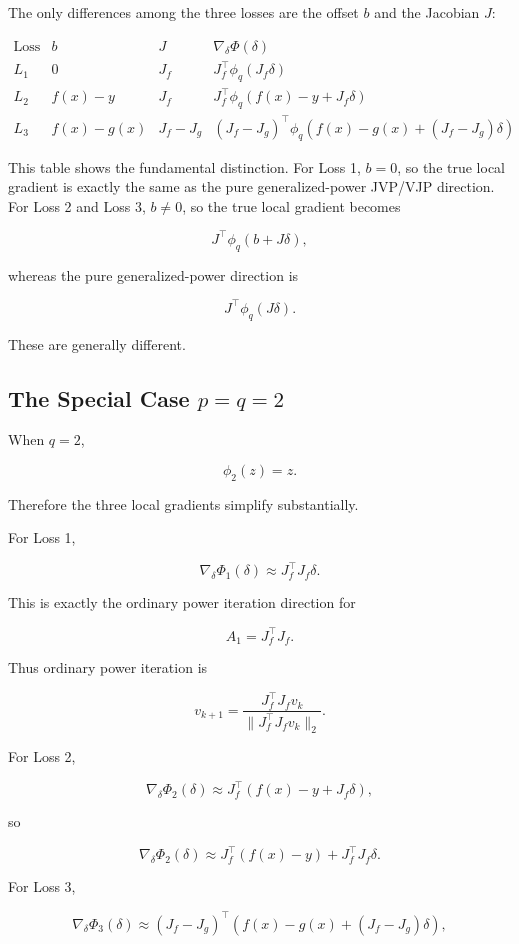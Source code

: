 \documentclass{article}
\begin{document}
The only differences among the three losses are the offset \(b\) and the Jacobian \(J\):

\[
\begin{array}{c|c|c|c}
\text{Loss} & b & J & \nabla_\delta \Phi(\delta)\\
\hline
L_1 & 0 & J_f
&
J_f^\top\phi_q(J_f\delta)
\\
L_2 & f(x)-y & J_f
&
J_f^\top\phi_q(f(x)-y+J_f\delta)
\\
L_3 & f(x)-g(x) & J_f-J_g
&
(J_f-J_g)^\top
\phi_q
\left(
f(x)-g(x)+(J_f-J_g)\delta
\right)
\end{array}
\]

This table shows the fundamental distinction. For Loss 1, \(b=0\), so the true local gradient is exactly the same as the pure generalized-power JVP/VJP direction. For Loss 2 and Loss 3, \(b\neq0\), so the true local gradient becomes

\[
J^\top\phi_q(b+J\delta),
\]

whereas the pure generalized-power direction is

\[
J^\top\phi_q(J\delta).
\]

These are generally different.

\subsection{The Special Case \(p=q=2\)}

When \(q=2\),

\[
\phi_2(z)=z.
\]

Therefore the three local gradients simplify substantially.

For Loss 1,

\[
\nabla_\delta \Phi_1(\delta)
\approx
J_f^\top J_f\delta.
\]

This is exactly the ordinary power iteration direction for

\[
A_1=J_f^\top J_f.
\]

Thus ordinary power iteration is

\[
v_{k+1}
=
\frac{J_f^\top J_fv_k}
{\|J_f^\top J_fv_k\|_2}.
\]

For Loss 2,

\[
\nabla_\delta \Phi_2(\delta)
\approx
J_f^\top
\left(
f(x)-y+J_f\delta
\right),
\]

so

\[
\nabla_\delta \Phi_2(\delta)
\approx
J_f^\top(f(x)-y)
+
J_f^\top J_f\delta.
\]

For Loss 3,

\[
\nabla_\delta \Phi_3(\delta)
\approx
(J_f-J_g)^\top
\left(
f(x)-g(x)+(J_f-J_g)\delta
\right),
\]
\end{document}
